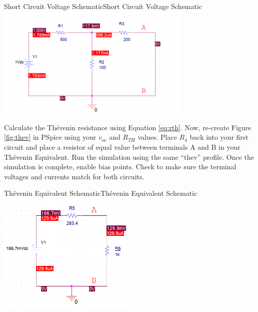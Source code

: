\documentclass[12pt]{../manual}
\begin{document}
\begin{myfigure}[colback=white,label=fig:shortCircuit]{Short Circuit Voltage Schematic}{Short Circuit Voltage Schematic}
\centering
\includegraphics[width=0.7\textwidth]{figures/ShortCircuitSchematicCrop.PNG}
\end{myfigure}

Calculate the Th\'evenin resistance using Equation \ref{eq:rth}. Now, re-create Figure \ref{fig:thev} in PSpice using your $v_{oc}$ and $R_{TH}$ values. Place $R_4$ back into your first circuit and place a resistor of equal value between terminals A and B in your Th\'evenin Equivalent. Run the simulation using the same ``thev'' profile. Once the simulation is complete, enable bias points. Check to make sure the terminal voltages and currents match for both circuits.

\begin{myfigure}[colback=white,label=fig:thevCircuit]{Th\'evenin Equivalent Schematic}{Th\'evenin Equivalent Schematic}
\centering
\includegraphics[width=0.5\textwidth]{figures/TheveninEquivalentExampleCrop.PNG}
\end{myfigure}


\newpage
\end{document}

